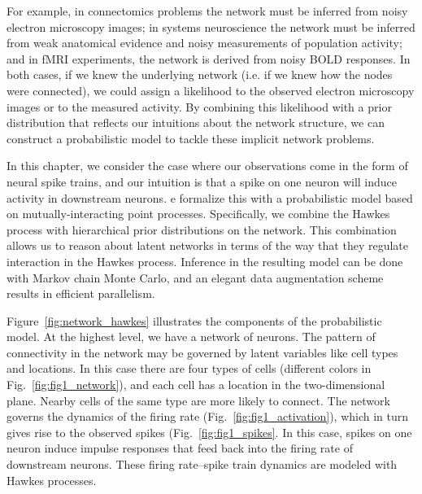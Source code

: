 For example, in connectomics problems the network must be inferred
from noisy electron microscopy images; in systems neuroscience the
network must be inferred from weak anatomical evidence and noisy
measurements of population activity; and in fMRI experiments, the
network is derived from noisy BOLD responses.  In both cases, if we
knew the underlying network (i.e.  if we knew how the nodes were
connected), we could assign a likelihood to the observed electron
microscopy images or to the measured activity. By combining this
likelihood with a prior distribution that reflects our intuitions
about the network structure, we can construct a probabilistic model to
tackle these implicit network problems.


In this chapter, we consider the case where our observations come in
the form of neural spike trains, and our intuition is that a spike on
one neuron will induce activity in downstream neurons.  e formalize
this with a probabilistic model based on mutually-interacting point
processes.  Specifically, we combine the Hawkes process
\cite{Hawkes-1971} with hierarchical prior distributions on the network.  This
combination allows us to reason about latent networks in terms of the
way that they regulate interaction in the Hawkes process.  Inference
in the resulting model can be done with Markov chain Monte Carlo, and
an elegant data augmentation scheme results in efficient parallelism.

Figure~\ref{fig:network_hawkes} illustrates the components of the
probabilistic model. At the highest level, we have a network of
neurons.  The pattern of connectivity in the network may be governed
by latent variables like cell types and locations. In this case there
are four types of cells (different colors in
Fig.~\ref{fig:fig1_network}), and each cell has a location in the
two-dimensional plane. Nearby cells of the same type are more likely
to connect. The network governs the dynamics of the firing rate
(Fig.~\ref{fig:fig1_activation}), which in turn gives rise to the
observed spikes (Fig.~\ref{fig:fig1_spikes}. In this case, spikes on
one neuron induce impulse responses that feed back into the firing
rate of downstream neurons. These firing rate--spike train dynamics are 
modeled with Hawkes processes. 

